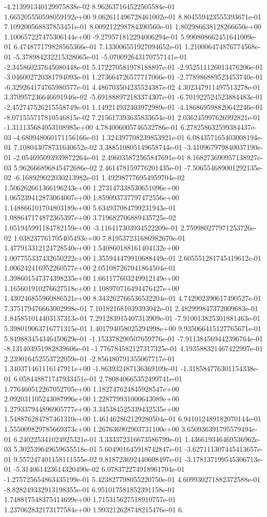 -4.213991340129975838e-02	8.962637164522505584e-01	1.665205550598059192e+00	9.062611496728461002e-01	8.804559423555393671e-01	7.109200568837853451e-01	8.009212298784390560e-01	1.802986638128266650e+00	1.100657227475306144e+00	-9.279571812294006294e-01	5.990808662451641009e-01	6.474877179828565366e-01	7.133006551927094652e-01	1.210006474876774568e-01	-5.378984232215328065e-01	-5.070092643170757141e-01	-2.345860237645080448e-01	5.172270581978188897e-01	-2.952511126013476206e-01	-3.046002720381794093e-01	1.273664726577717066e-01	-2.778986889523453740e-01	-6.329264174765980577e-01	4.486703504235524387e-02	4.302347911497513278e-01	3.370957236646691946e-02	-5.691888972183374307e-01	-6.701922524523884483e-01	-2.452747526215558749e-01	1.149214932403972989e-01	-4.186869598820642246e-01	-8.071555717810546815e-02	7.215617393635833654e-01	2.036245997626992821e-01	-1.311135684053108985e+00	4.784006005746532786e-01	6.278258632599384437e-03	-4.680948060171156166e-01	1.324397708239853921e-01	6.084357165403008194e-01	7.108043078731640652e-02	3.388510805149658744e-01	-3.410967979840037190e-01	-2.054695093939872264e-01	2.496035872565847691e-01	8.168273690957138927e-03	5.962666896845472686e-02	2.461478159776201435e-01	-7.506554689001292135e-02	-6.168929022030213982e-01	1.492987776954959704e-02	1.506262661366196243e+00	1.273147338530651096e+00	1.065239412873064007e+00	1.859093737797472556e+00	1.148866101704803189e+00	5.634937084799231943e-01	1.088647174872365397e+00	3.719682706889435725e-02	1.051945991184782159e+00	-3.116417303934522209e-01	2.759980277971253726e-02	1.038237761705405493e+00	7.819537231686982670e-01	1.477913312124728540e+00	1.540860188161404132e+00	1.007755337432650222e+00	1.355944479910688449e-01	2.605551281745419612e-01	1.006242416952260577e+00	2.051087267041864504e-01	1.398601547374398235e+00	1.661177603249912149e+00	1.165601910276627518e+00	1.108970716494476427e+00	1.430246855960886521e+00	8.343262766536532204e-01	4.742902390617490527e-01	7.375179476663002998e-01	7.101821681039393042e-01	2.482999847372009683e-01	1.845851014403137313e-01	7.291283915407313909e-01	-7.910013825301881463e-01	5.398019063716771315e-01	1.401794058025294998e+00	9.935066415127765671e-01	5.849883454346450629e-01	-1.153378290507659776e-01	-7.911384569442396764e-01	-8.131403951982839606e-01	-1.776784582127317325e-01	4.193588321467422997e-01	2.239016452553722059e-01	-2.856480791355067717e-01	1.340371461116147911e+00	-1.863932487136369109e-01	-1.318584776301154338e-01	6.058448871747933451e-01	2.780840665352499741e-01	1.776460512267052705e+00	1.182747624845928547e+00	2.092031105243087996e+00	1.228779931000643089e+00	1.279337944896905777e+00	3.345384525339432535e+00	1.548876284787461310e+00	1.461462862129280504e-01	6.941012489182070144e-01	1.555009829785669373e+00	1.267636902903731100e+00	3.650936391795579494e-01	6.240225341024925321e-01	3.333372316673586799e-01	1.436619346469536962e-03	5.302539649659655518e-01	5.604901645918742847e-01	-3.627111307445413657e-01	9.557247401158111555e-02	9.818723692440608497e-01	-3.178137199545306713e-01	-5.314061423614320490e-02	6.078372274918961704e-01	-1.275725654863435199e-01	5.423827798055220750e-01	4.609930271882372588e-01	-8.828249332913198355e-01	6.951017581852391158e-01	1.748817548375414699e+00	1.715315627518910757e-01	1.237062832173177584e+00	1.993212628748215476e-01	6.